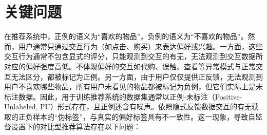 \section{关键问题}
在推荐系统中，正例的语义为“喜欢的物品”，负例的语义为“不喜欢的物品”。然而，用户通常只通过交互行为（如点击、购买）来表达偏好或兴趣。一方面，这些交互行为通常不包含显式的评分，只能观测到交互的有无，无法观测到交互数据所对应的偏好强度高低。不体现偏好的交互如代购、误触、查看等异常模式与正常交互无法区分，都被标记为正例\cite{Yu:2018:CIKM,Qiu:2018:IS,Wang:2021:WSDM}。另一方面，由于用户仅仅提供正反馈，无法观测到用户不喜欢哪些物品，所有用户未看见的物品都被标记为负例，但它们实际上是未标注数据\cite{Ding:2020:NIPS,Zhang:2013:SIGIR,Yang:2020:KDD}。因此，用于训练推荐系统的数据集通常以正例-未标注（Positive-Unlabeled, PU）形式存在，且正例还含有噪声。依照隐式反馈数据交互的有无获取的正负样本的“伪标签”，与真实的偏好标签具有不一致性。这一现象，导致自监督设置下的对比型推荐算法存在以下问题：
